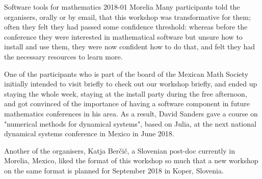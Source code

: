 \begin{event}{Software tools for mathematics 2018-01 Morelia}
Many participants told the organisers, orally or by email, that this workshop
was transformative for them; often they felt they had passed some confidence
threshold: whereas before the conference they were interested in mathematical
software but unsure how to install and use them, they were now confident how
to do that, and felt they had the necessary resources to learn more.

One of the participants who is part of the board of the Mexican Math Society
initially intended to visit briefly to check out our workshop briefly, and
ended up staying the whole week, staying at the install party during the free
afternoon, and got convinced of the importance of having a software component
in future mathematics conferences in his area. As a result, David Sanders
gave a course on "numerical methods for dynamical systems", based on Julia,
at the next national dynamical systems conference in Mexico in June 2018.

Another of the organisers, Katja Berčič, a Slovenian post-doc currently in
Morelia, Mexico, liked the format of this workshop so much that a new workshop
on the same format is planned for September 2018 in Koper, Slovenia.


\end{event}
